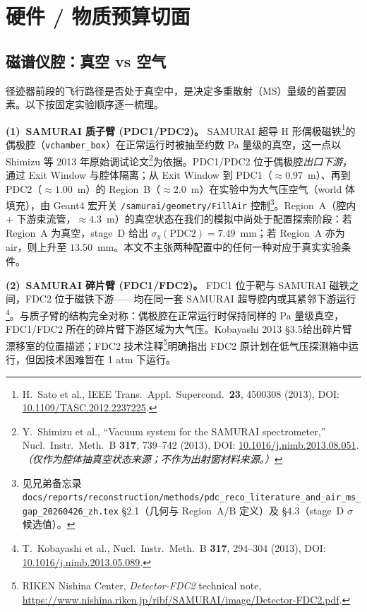 \documentclass[a4paper, 11pt]{article}
\begin{document}
\section{硬件 / 物质预算切面}

\subsection{磁谱仪腔：真空 vs 空气}
\label{sec:cavity}

径迹器前段的飞行路径是否处于真空中，是决定多重散射（MS）量级的首要因素。以下按固定实验顺序逐一梳理。

\textbf{(1)~SAMURAI 质子臂 (PDC1/PDC2)。}
SAMURAI 超导 H 形偶极磁铁\footnote{\label{fn:sato2013hw}H.~Sato et al., IEEE Trans.\ Appl.\ Supercond.\ \textbf{23}, 4500308 (2013), DOI: \href{https://doi.org/10.1109/TASC.2012.2237225}{10.1109/TASC.2012.2237225}.}的偶极腔（\texttt{vchamber\_box}）在正常运行时被抽至约数 Pa 量级的真空，这一点以 Shimizu 等 2013 年原始调试论文\footnote{\label{fn:shimizu2013hw}Y.~Shimizu et al., ``Vacuum system for the SAMURAI spectrometer,'' Nucl.\ Instr.\ Meth.\ B \textbf{317}, 739--742 (2013), DOI: \href{https://doi.org/10.1016/j.nimb.2013.08.051}{10.1016/j.nimb.2013.08.051}. \emph{（仅作为腔体抽真空状态来源；不作为出射窗材料来源。）}}为依据。PDC1/PDC2 位于偶极腔\emph{出口下游}，通过 Exit Window 与腔体隔离；从 Exit Window 到 PDC1（$\approx 0.97$~m）、再到 PDC2（$\approx 1.00$~m）的 Region~B（$\approx 2.0$~m）在实验中为大气压空气（world 体填充），由 Geant4 宏开关 \texttt{/samurai/geometry/FillAir} 控制\footnote{\label{fn:msablation_hw}见兄弟备忘录 \texttt{docs/reports/reconstruction/methods/pdc\_reco\_literature\_and\_air\_ms\_gap\_20260426\_zh.tex} §2.1（几何与 Region~A/B 定义）及 §4.3（stage~D $\sigma$ 候选值）。}。Region~A（腔内 + 下游束流管，$\approx 4.3$~m）的真空状态在我们的模拟中尚处于配置探索阶段：若 Region~A 为真空，stage~D 给出 $\sigma_y(\text{PDC2}) = 7.49$~mm；若 Region~A 亦为 air，则上升至 $13.50$~mm。本文不主张两种配置中的任何一种对应于真实实验条件。

\textbf{(2)~SAMURAI 碎片臂 (FDC1/FDC2)。}
FDC1 位于靶与 SAMURAI 磁铁之间，FDC2 位于磁铁下游——均在同一套 SAMURAI 超导腔内或其紧邻下游运行\footnote{\label{fn:kobayashi2013hw}T.~Kobayashi et al., Nucl.\ Instr.\ Meth.\ B \textbf{317}, 294--304 (2013), DOI: \href{https://doi.org/10.1016/j.nimb.2013.05.089}{10.1016/j.nimb.2013.05.089}.}。与质子臂的结构完全对称：偶极腔在正常运行时保持同样的 Pa 量级真空，FDC1/FDC2 所在的碎片臂下游区域为大气压。Kobayashi 2013 §3.5给出碎片臂漂移室的位置描述；FDC2 技术注释\footnote{\label{fn:fdc2note}RIKEN Nishina Center, \emph{Detector-FDC2} technical note, \url{https://www.nishina.riken.jp/ribf/SAMURAI/image/Detector-FDC2.pdf}.}明确指出 FDC2 原计划在低气压探测箱中运行，但因技术困难暂在 1 atm 下运行。
\end{document}

